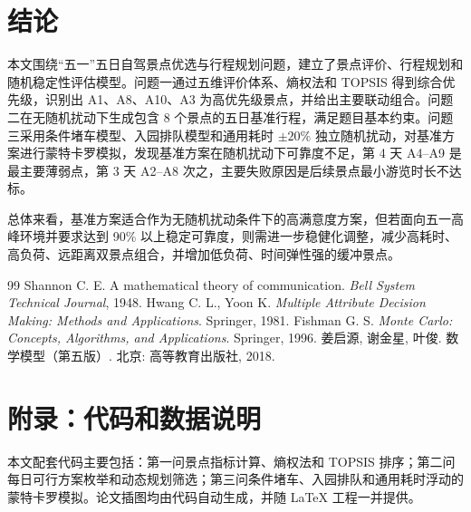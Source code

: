 \documentclass[UTF8,a4paper,12pt]{ctexart}
\begin{document}
\section{结论}

本文围绕“五一”五日自驾景点优选与行程规划问题，建立了景点评价、行程规划和随机稳定性评估模型。问题一通过五维评价体系、熵权法和 TOPSIS 得到综合优先级，识别出 A1、A8、A10、A3 为高优先级景点，并给出主要联动组合。问题二在无随机扰动下生成包含 8 个景点的五日基准行程，满足题目基本约束。问题三采用条件堵车模型、入园排队模型和通用耗时 $\pm20\%$ 独立随机扰动，对基准方案进行蒙特卡罗模拟，发现基准方案在随机扰动下可靠度不足，第 4 天 A4--A9 是最主要薄弱点，第 3 天 A2--A8 次之，主要失败原因是后续景点最小游览时长不达标。

总体来看，基准方案适合作为无随机扰动条件下的高满意度方案，但若面向五一高峰环境并要求达到 90\% 以上稳定可靠度，则需进一步稳健化调整，减少高耗时、高负荷、远距离双景点组合，并增加低负荷、时间弹性强的缓冲景点。

\begin{thebibliography}{99}
 Shannon C. E. A mathematical theory of communication. \textit{Bell System Technical Journal}, 1948.
 Hwang C. L., Yoon K. \textit{Multiple Attribute Decision Making: Methods and Applications}. Springer, 1981.
 Fishman G. S. \textit{Monte Carlo: Concepts, Algorithms, and Applications}. Springer, 1996.
 姜启源, 谢金星, 叶俊. 数学模型（第五版）. 北京: 高等教育出版社, 2018.
\end{thebibliography}

\appendix
\section{附录：代码和数据说明}

本文配套代码主要包括：第一问景点指标计算、熵权法和 TOPSIS 排序；第二问每日可行方案枚举和动态规划筛选；第三问条件堵车、入园排队和通用耗时浮动的蒙特卡罗模拟。论文插图均由代码自动生成，并随 LaTeX 工程一并提供。
\end{document}
